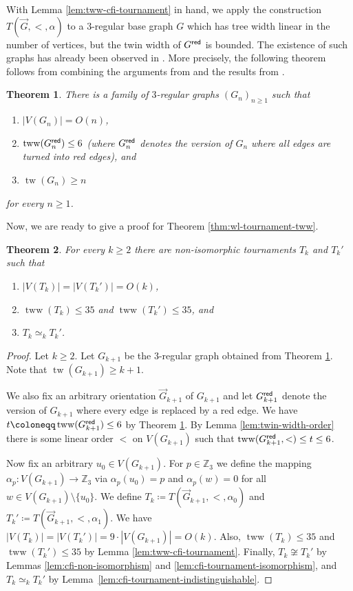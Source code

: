 \PassOptionsToPackage{dvipsnames,svgnames}{xcolor}\documentclass[10pt,a4paper]{article}
\newtheorem{theorem}{Theorem}[section]
\newcommand{\ZZ}{{\mathbb Z}}
\newcommand{\red}{{\sf red}}
\DeclareMathOperator{\tw}{tw}
\DeclareMathOperator{\tww}{tww}
\begin{document}
With Lemma \ref{lem:tww-cfi-tournament} in hand, we apply the construction $T(\vec{G},<,\alpha)$ to a $3$-regular base graph $G$ which has tree width linear in the number of vertices, but the twin width of $G^{\red}$ is bounded.
The existence of such graphs has already been observed in \cite{BonnetGKTW22}.
More precisely, the following theorem follows from combining the arguments from \cite[Lemma 5.1]{BonnetGKTW22} and the results from \cite{BiluL06,MarcusSS15}.

\begin{theorem}
 \label{thm:expander-bounded-tww}
 There is a family of $3$-regular graphs $(G_n)_{n \geq 1}$ such that
 \begin{enumerate}
  \item $|V(G_n)| = O(n)$,
  \item $\tww(G_n^{\red}) \leq 6$ (where $G_n^{\red}$ denotes the version of $G_n$ where all edges are turned into red edges), and
  \item $\tw(G_n) \geq n$
 \end{enumerate}
 for every $n \geq 1$.
\end{theorem}

Now, we are ready to give a proof for Theorem \ref{thm:wl-tournament-tww}.

\begin{theorem}
 For every $k \geq 2$ there are non-isomorphic tournaments $T_k$ and $T_k'$ such that
 \begin{enumerate}
  \item $|V(T_k)| = |V(T_k')| = O(k)$,
  \item $\tww(T_k) \leq 35$ and $\tww(T_k') \leq 35$, and
  \item $T_k \simeq_k T_k'$.
 \end{enumerate}
\end{theorem}

\begin{proof}
 Let $k \geq 2$.
 Let $G_{k+1}$ be the $3$-regular graph obtained from Theorem \ref{thm:expander-bounded-tww}.
 Note that $\tw(G_{k+1}) \geq k+1$.

 We also fix an arbitrary orientation $\vec{G}_{k+1}$ of $G_{k+1}$ and let $G_{k+1}^{\red}$ denote the version of $G_{k+1}$ where every edge is replaced by a red edge.
 We have $t \coloneqq \tww(G_{k+1}^{\red}) \leq 6$ by Theorem \ref{thm:expander-bounded-tww}.
 By Lemma \ref{lem:twin-width-order} there is some linear order $<$ on $V(G_{k+1})$ such that $\tww(G_{k+1}^\red,<) \leq t \leq 6$.

 Now fix an arbitrary $u_0 \in V(G_{k+1})$.
 For $p \in \ZZ_3$ we define the mapping $\alpha_p \colon V(G_{k+1}) \to \ZZ_3$ via $\alpha_p(u_0) = p$ and $\alpha_p(w) = 0$ for all $w \in V(G_{k+1}) \setminus \{u_0\}$.
 We define $T_k \coloneqq T(\vec{G}_{k+1},<,\alpha_0)$ and $T_k' \coloneqq T(\vec{G}_{k+1},<,\alpha_1)$.
 We have $|V(T_k)| = |V(T_k')| = 9 \cdot |V(G_{k+1})| = O(k)$.
 Also, $\tww(T_k) \leq 35$ and $\tww(T_k') \leq 35$ by Lemma \ref{lem:tww-cfi-tournament}.
 Finally, $T_k \not\cong T_k'$ by Lemmas \ref{lem:cfi-non-isomorphism} and \ref{lem:cfi-tournament-isomorphism}, and $T_k \simeq_k T_k'$ by Lemma~\ref{lem:cfi-tournament-indistinguishable}.
\end{proof}
\end{document}
